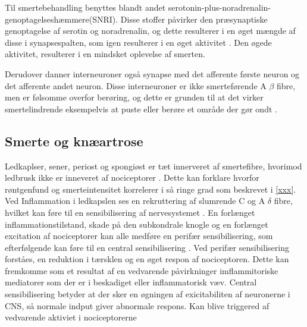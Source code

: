 Til smertebehandling benyttes blandt andet serotonin-plus-noradrenalin-genoptagelseshæmmere(SNRI). Disse stoffer påvirker den præsynaptiske genoptagelse af serotin og noradrenalin, og dette resulterer i en øget mængde af disse i synapsespalten, som igen  resulterer i en øget aktivitet \citep{smerter}. Den øgede aktivitet, resulterer i en mindsket oplevelse af smerten. 

Derudover danner  interneuroner også synapse med det afferente første neuron og det afferente andet neuron. Disse interneuroner er ikke smerteførende A $\beta$ fibre, men er følsomme overfor berøring, og dette er grunden til at det virker smertelindrende eksempelvis at puste eller  berøre et område der gør ondt \citep{cindys268}.

\subsection{Smerte og knæartrose}
Ledkaplser, sener, periost og spongiøst er tæt innerveret af smertefibre, hvorimod ledbrusk ikke er inneveret af nociceptorer \citep{smerter}. Dette kan forklare hvorfor  røntgenfund og smerteintensitet korrelerer i så ringe grad som beskrevet i \ref{xxx}. \citep{Petersen2016}  \citep{smerter}
Ved Inflammation i ledkapslen ses en rekruttering af slumrende C og A $\delta$ fibre, hvilket kan føre til en sensibilisering af nervesystemet \citep{smerter}. En  forlænget inflammationstilstand, skade på den subkondrale knogle og en forlænget excitation af nociceptorer kan alle medføre en  perifær sensibilisering, som efterfølgende kan føre til en central sensibilisering \citep{Petersen2016} .
Ved perifær sensibilisering forståes, en reduktion i tærsklen og en øget respon af nociceptoren. Dette kan fremkomme som et resultat af en vedvarende påvirkninger imflammitoriske mediatorer som der er i beskadiget eller inflammatorisk væv. 
Central sensibilisering betyder at der sker en øgningen af exicitabiliten af neuronerne i CNS, så normale indput giver abnormale respons. Kan blive triggered af vedvarende aktiviet i nociceptorerne \citep{nature}


